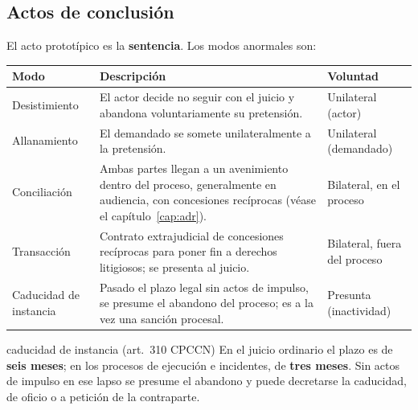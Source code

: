 \documentclass[12pt,oneside]{book}
\renewcommand{\arraystretch}{1.15}
\begin{document}
\subsection{Actos de conclusión}

El acto prototípico es la \textbf{sentencia}. Los modos anormales son:

\begin{table}[H]
\centering
\renewcommand{\arraystretch}{1.25}
\begin{tabularx}{\textwidth}{>{\RaggedRight\arraybackslash}p{}>{\RaggedRight\arraybackslash}X>{\RaggedRight\arraybackslash}p{}}
\toprule
\textbf{Modo} & \textbf{Descripción} & \textbf{Voluntad} \\
\midrule
Desistimiento & El actor decide no seguir con el juicio y abandona voluntariamente su pretensión. & Unilateral (actor) \\
\addlinespace
Allanamiento & El demandado se somete unilateralmente a la pretensión. & Unilateral (demandado) \\
\addlinespace
Conciliación & Ambas partes llegan a un avenimiento dentro del proceso, generalmente en audiencia, con concesiones recíprocas (véase el capítulo~\ref{cap:adr}). & Bilateral, en el proceso \\
\addlinespace
Transacción & Contrato extrajudicial de concesiones recíprocas para poner fin a derechos litigiosos; se presenta al juicio. & Bilateral, fuera del proceso \\
\addlinespace
Caducidad de instancia & Pasado el plazo legal sin actos de impulso, se presume el abandono del proceso; es a la vez una sanción procesal. & Presunta (inactividad) \\
\bottomrule
\end{tabularx}
\end{table}

\begin{regla}{caducidad de instancia (art.~310 CPCCN)}
En el juicio ordinario el plazo es de \textbf{seis meses}; en los procesos de ejecución e incidentes, de \textbf{tres meses}. Sin actos de impulso en ese lapso se presume el abandono y puede decretarse la caducidad, de oficio o a petición de la contraparte.
\end{regla}
\end{document}
